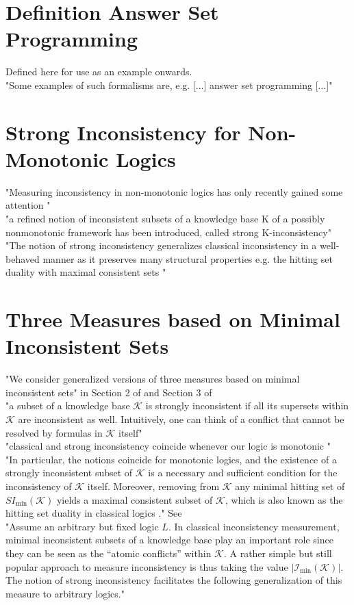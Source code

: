 \section{Definition Answer Set Programming}
Defined here for use as an example onwards.\\
"Some examples of such formalisms are, e.g. [...] answer set programming \cite{gelfond_logic_2002} [...]"

\section{Strong Inconsistency for Non-Monotonic Logics}

"Measuring inconsistency in non-monotonic logics has only recently gained some attention \cite{michael_measuring_2016} \cite{brewka_strong_2017} \cite{ulbricht_measuring_2018} \cite{brewka_strong_2019}"
\\
"a refined notion of inconsistent subsets of a knowledge base K of a possibly nonmonotonic framework has been introduced, called strong K-inconsistency"
\cite{brewka_strong_2017}
\\
"The notion of strong inconsistency generalizes classical inconsistency in a well-behaved manner as it preserves many structural properties e.g. the hitting set duality with maximal consistent sets \cite{reiter_theory_1987}"

\section{Three Measures based on Minimal Inconsistent Sets}
"We consider generalized versions of three measures based on minimal inconsistent sets" in Section 2 of \cite{ulbricht_measuring_2018} and Section 3 of \cite{ulbricht_handling_2020}
\\
"a subset of a knowledge base \(\mathcal{K}\) is strongly inconsistent if all its supersets within \(\mathcal{K}\) are inconsistent as well. Intuitively, one can think of a conflict that cannot be resolved by formulas in \(\mathcal{K}\) itself"
\\
"classical and strong inconsistency coincide whenever our logic is monotonic \cite{brewka_strong_2019}"
\\
"In particular, the notions coincide for monotonic logics, and the existence of a strongly inconsistent subset of \(\mathcal{K}\) is a necessary and sufficient condition for the inconsistency of \(\mathcal{K}\) itself. Moreover, removing from \(\mathcal{K}\) any minimal hitting set of \(SI_{\min}(\mathcal{K})\) yields a maximal consistent subset of \(\mathcal{K}\), which is also known as the hitting set duality in classical logics \cite{reiter_theory_1987}." See \cite{brewka_strong_2017}
\\
"Assume an arbitrary but fixed logic \(L\). In classical inconsistency measurement, minimal inconsistent subsets of a knowledge base play an important role since they can be seen as the “atomic conflicts” within \(\mathcal{K}\). A rather simple but still popular approach to measure inconsistency is thus taking the value \(\left| \mathcal{I}_{\min}(\mathcal{K}) \right|\). The notion of strong inconsistency facilitates the following generalization of this measure to arbitrary logics."

